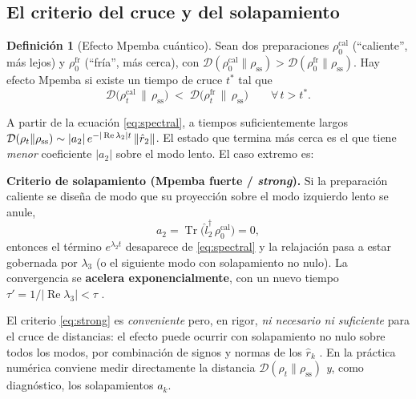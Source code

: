 \documentclass[11pt,a4paper]{article}
\theoremstyle{definition}
\newtheorem{definicion}{Definición}[section]
\theoremstyle{plain}
\newcommand{\Dop}{\mathcal{D}}
\newcommand{\rss}{\rho_{\mathrm{ss}}}
\renewcommand{\Tr}{\operatorname{Tr}}
\begin{document}
\subsection{El criterio del cruce y del solapamiento}

\begin{definicion}[Efecto Mpemba cuántico]
Sean dos preparaciones $\rho^{\mathrm{cal}}_0$ (``caliente'', más lejos) y $\rho^{\mathrm{fr}}_0$
(``fría'', más cerca), con
$\Dop(\rho^{\mathrm{cal}}_0\|\rss) > \Dop(\rho^{\mathrm{fr}}_0\|\rss)$.
Hay efecto Mpemba si existe un tiempo de cruce $t^{*}$ tal que
\begin{equation}
\Dop\!\big(\rho^{\mathrm{cal}}_{t}\,\|\,\rss\big) \;<\; \Dop\!\big(\rho^{\mathrm{fr}}_{t}\,\|\,\rss\big)
\qquad \forall\, t> t^{*}.
\end{equation}
\end{definicion}

A partir de la ecuación \eqref{eq:spectral}, a tiempos suficientemente largos
$\Dop(\rho_t\|\rss)\sim |a_2|\,e^{-|\operatorname{Re}\lambda_2| t}\,\norm{\hat r_2}$. El estado que termina
más cerca es el que tiene \emph{menor} coeficiente $|a_2|$ sobre el modo lento. El caso extremo es:

\begin{cajaclave}
\textbf{Criterio de solapamiento (Mpemba fuerte / \emph{strong}).} Si la preparación caliente se diseña de
modo que su proyección sobre el modo izquierdo lento se anule,
\begin{equation}
a_2=\Tr\!\big(\hat l_2^{\dagger}\,\rho^{\mathrm{cal}}_0\big)=0,
\label{eq:strong}
\end{equation}
entonces el término $e^{\lambda_2 t}$ desaparece de \eqref{eq:spectral} y la relajación pasa a estar
gobernada por $\lambda_3$ (o el siguiente modo con solapamiento no nulo). La convergencia se
\textbf{acelera exponencialmente}, con un nuevo tiempo $\tau'=1/|\operatorname{Re}\lambda_3|<\tau$
\cite{Carollo2021,Zhang2025}.
\end{cajaclave}

\noindent
El criterio \eqref{eq:strong} es \emph{conveniente} pero, en rigor, \emph{ni necesario ni suficiente} para
el cruce de distancias: el efecto puede ocurrir con solapamiento no nulo sobre todos los modos, por
combinación de signos y normas de los $\hat r_k$ \cite{LiYang2026}. En la práctica numérica conviene medir
directamente la distancia $\Dop(\rho_t\|\rss)$ \emph{y}, como diagnóstico, los solapamientos
$a_k$.

\end{document}
